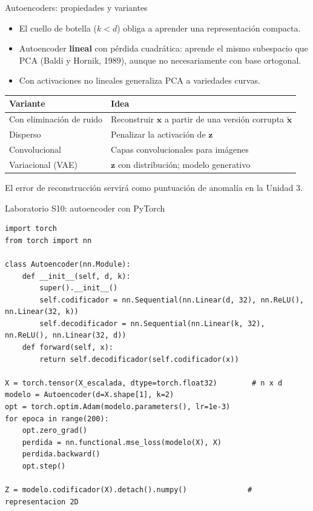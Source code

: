 \documentclass[aspectratio=169,11pt]{beamer}
\newcommand{\x}{\bm{x}}
\newcommand{\z}{\bm{z}}
\begin{document}
\begin{frame}{Autoencoders: propiedades y variantes}
  \begin{itemize}
    \item El \alert{cuello de botella} ($k<d$) obliga a aprender una representación compacta.
    \item Autoencoder \textbf{lineal} con pérdida cuadrática: aprende el mismo subespacio que PCA
          (Baldi y Hornik, 1989), aunque no necesariamente con base ortogonal.
    \item Con activaciones no lineales generaliza PCA a variedades curvas.
  \end{itemize}
  \vspace{4pt}
  \begin{tabular}{@{}ll@{}}
    \toprule
    \textbf{Variante} & \textbf{Idea}\\
    \midrule
    Con eliminación de ruido & Reconstruir $\x$ a partir de una versión corrupta $\tilde{\x}$\\
    Disperso & Penalizar la activación de $\z$\\
    Convolucional & Capas convolucionales para imágenes\\
    Variacional (VAE) & $\z$ con distribución; modelo generativo\\
    \bottomrule
  \end{tabular}
  \vspace{4pt}
  {\small El error de reconstrucción servirá como puntuación de anomalía en la Unidad 3.}
\end{frame}

\begin{frame}[fragile]{Laboratorio S10: autoencoder con PyTorch}
\begin{lstlisting}
import torch
from torch import nn

class Autoencoder(nn.Module):
    def __init__(self, d, k):
        super().__init__()
        self.codificador = nn.Sequential(nn.Linear(d, 32), nn.ReLU(), nn.Linear(32, k))
        self.decodificador = nn.Sequential(nn.Linear(k, 32), nn.ReLU(), nn.Linear(32, d))
    def forward(self, x):
        return self.decodificador(self.codificador(x))

X = torch.tensor(X_escalada, dtype=torch.float32)        # n x d
modelo = Autoencoder(d=X.shape[1], k=2)
opt = torch.optim.Adam(modelo.parameters(), lr=1e-3)
for epoca in range(200):
    opt.zero_grad()
    perdida = nn.functional.mse_loss(modelo(X), X)
    perdida.backward()
    opt.step()

Z = modelo.codificador(X).detach().numpy()              # representacion 2D
\end{lstlisting}
\end{frame}
\end{document}
